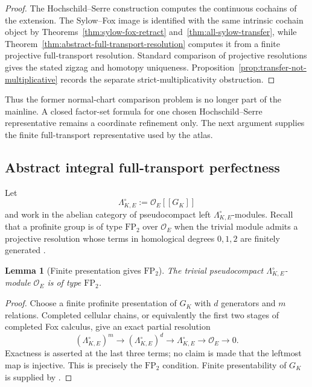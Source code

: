 \documentclass[11pt]{article}
\newtheorem{lemma}[theorem]{Lemma}
\theoremstyle{definition}
\begin{document}
\begin{proof}
The Hochschild--Serre construction computes the continuous cochains of the extension.  The Sylow--Fox image is identified with the same intrinsic cochain object by Theorems~\ref{thm:sylow-fox-retract} and~\ref{thm:all-sylow-transfer}, while Theorem~\ref{thm:abstract-full-transport-resolution} computes it from a finite projective full-transport resolution.  Standard comparison of projective resolutions gives the stated zigzag and homotopy uniqueness.  Proposition~\ref{prop:transfer-not-multiplicative} records the separate strict-multiplicativity obstruction.
\end{proof}

Thus the former normal-chart comparison problem is no longer part of the mainline.  A closed factor-set formula for one chosen Hochschild--Serre representative remains a coordinate refinement only.  The next argument supplies the finite full-transport representative used by the atlas.

\subsection{Abstract integral full-transport perfectness}\label{subsec:abstract-full-transport}

Let
\[
\Lambda_{K,E}^{\circ}:=\mathcal O_E[[G_K]]
\]
and work in the abelian category of pseudocompact left $\Lambda_{K,E}^{\circ}$-modules.  Recall that a profinite group is of type $\mathrm{FP}_2$ over $\mathcal O_E$ when the trivial module admits a projective resolution whose terms in homological degrees $0,1,2$ are finitely generated \cite{CookFP}.

\begin{lemma}[Finite presentation gives $\mathrm{FP}_2$]\label{lem:finite-presentation-fp2}
The trivial pseudocompact $\Lambda_{K,E}^{\circ}$-module $\mathcal O_E$ is of type $\mathrm{FP}_2$.
\end{lemma}

\begin{proof}
Choose a finite profinite presentation of $G_K$ with $d$ generators and $m$ relations.  Completed cellular chains, or equivalently the first two stages of completed Fox calculus, give an exact partial resolution
\[
(\Lambda_{K,E}^{\circ})^m
\longrightarrow
(\Lambda_{K,E}^{\circ})^d
\longrightarrow
\Lambda_{K,E}^{\circ}
\longrightarrow
\mathcal O_E
\longrightarrow0.
\]
Exactness is asserted at the last three terms; no claim is made that the leftmost map is injective.  This is precisely the $\mathrm{FP}_2$ condition.  Finite presentability of $G_K$ is supplied by \cite{JannsenWingberg,JardenShusterman,NeukirchLocal}.
\end{proof}
\end{document}
